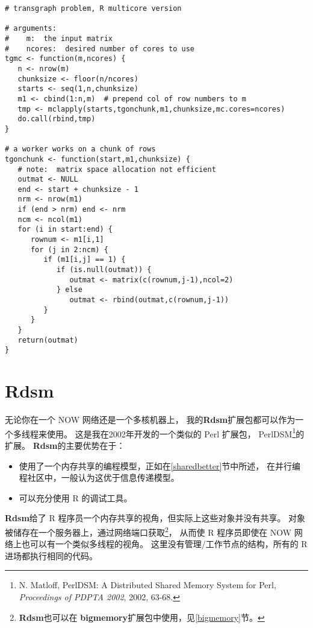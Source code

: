 \begin{lstlisting}
# transgraph problem, R multicore version

# arguments:
#    m:  the input matrix
#    ncores:  desired number of cores to use
tgmc <- function(m,ncores) {
   n <- nrow(m)
   chunksize <- floor(n/ncores)
   starts <- seq(1,n,chunksize)
   m1 <- cbind(1:n,m)  # prepend col of row numbers to m
   tmp <- mclapply(starts,tgonchunk,m1,chunksize,mc.cores=ncores)
   do.call(rbind,tmp)
}

# a worker works on a chunk of rows
tgonchunk <- function(start,m1,chunksize) {
   # note:  matrix space allocation not efficient
   outmat <- NULL
   end <- start + chunksize - 1
   nrm <- nrow(m1)
   if (end > nrm) end <- nrm
   ncm <- ncol(m1)
   for (i in start:end) {
      rownum <- m1[i,1]
      for (j in 2:ncm) {
         if (m1[i,j] == 1) {
            if (is.null(outmat)) {
               outmat <- matrix(c(rownum,j-1),ncol=2)
            } else
               outmat <- rbind(outmat,c(rownum,j-1))
         }
      }
   }
   return(outmat)
}
\end{lstlisting}


\section{Rdsm}


无论你在一个 NOW 网络还是一个多核机器上，
我的{\bf Rdsm}扩展包都可以作为一个多线程来使用。
这是我在2002年开发的一个类似的 Perl 扩展包， PerlDSM\footnote{N.
Matloff, PerlDSM: A Distributed Shared Memory System for Perl, {\it
Proceedings of PDPTA 2002}, 2002, 63-68.}的扩展。
{\bf Rdsm}的主要优势在于：

\begin{itemize}

\item 使用了一个内存共享的编程模型，正如在\ref{sharedbetter}节中所述，
在并行编程社区中，一般认为这优于信息传递模型。

\item 可以充分使用 R 的调试工具。

\end{itemize}

{\bf Rdsm}给了 R 程序员一个内存共享的视角，但实际上这些对象并没有共享。
对象被储存在一个服务器上，通过网络端口获取\footnote{{\bf Rdsm}也可以在
{\bf bigmemory}扩展包中使用，见\ref{bigmemory}节。}，
从而使 R 程序员即使在 NOW 网络上也可以有一个类似多线程的视角。
这里没有管理/工作节点的结构，所有的 R 进场都执行相同的代码。

